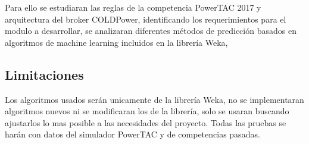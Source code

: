 Para ello se estudiaran las reglas de la competencia PowerTAC 2017 y arquitectura del broker COLDPower, identificando los requerimientos para el modulo a desarrollar, se analizaran diferentes métodos de predicción basados en algoritmos de machine learning incluidos en la librería Weka, 

\subsection{Limitaciones}
Los algoritmos usados serán unicamente de la librería Weka, no se implementaran algoritmos nuevos ni se modificaran los de la librería, solo se usaran buscando ajustarlos lo mas posible a las necesidades del proyecto.
Todas las pruebas se harán con datos del simulador PowerTAC y de competencias pasadas.


